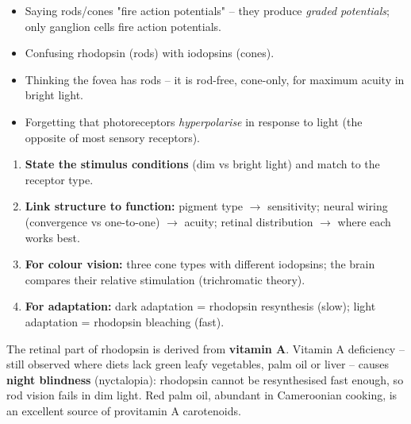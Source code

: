\documentclass[11pt]{article}
\begin{document}
\begin{attention}
\begin{itemize}
\item Saying rods/cones "fire action potentials" -- they produce \emph{graded potentials}; only ganglion cells fire action potentials.
\item Confusing rhodopsin (rods) with iodopsins (cones).
\item Thinking the fovea has rods -- it is rod-free, cone-only, for maximum acuity in bright light.
\item Forgetting that photoreceptors \emph{hyperpolarise} in response to light (the opposite of most sensory receptors).
\end{itemize}
\end{attention}

\begin{methode}
\begin{enumerate}
\item \textbf{State the stimulus conditions} (dim vs bright light) and match to the receptor type.
\item \textbf{Link structure to function:} pigment type $\rightarrow$ sensitivity; neural wiring (convergence vs one-to-one) $\rightarrow$ acuity; retinal distribution $\rightarrow$ where each works best.
\item \textbf{For colour vision:} three cone types with different iodopsins; the brain compares their relative stimulation (trichromatic theory).
\item \textbf{For adaptation:} dark adaptation = rhodopsin resynthesis (slow); light adaptation = rhodopsin bleaching (fast).
\end{enumerate}
\end{methode}

\begin{savaistu}
The retinal part of rhodopsin is derived from \textbf{vitamin A}. Vitamin A deficiency -- still observed where diets lack green leafy vegetables, palm oil or liver -- causes \textbf{night blindness} (nyctalopia): rhodopsin cannot be resynthesised fast enough, so rod vision fails in dim light. Red palm oil, abundant in Cameroonian cooking, is an excellent source of provitamin A carotenoids.
\end{savaistu}
\end{document}
